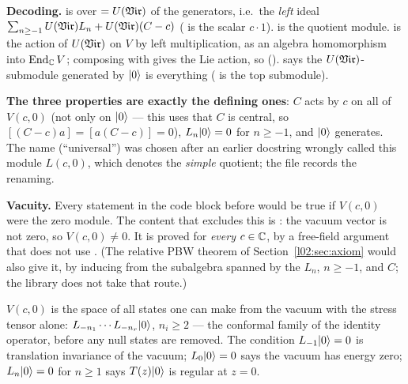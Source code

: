 \begin{dictionary}
\textbf{Decoding.}  is  over  $=U(\mathfrak{Vir})$ of
the generators, i.e.\ the \emph{left} ideal $\sum_{n\ge-1}U(\mathfrak{Vir})L_n + U(\mathfrak{Vir})(C-c)$
( is the scalar $c\cdot 1$).  is the quotient module.
 is the action of $U(\mathfrak{Vir})$ on $V$ by left multiplication, as an
algebra homomorphism into $\operatorname{End}_{\mathbb{C}} V$; composing with  gives the Lie action, so
 ().  says the
$U(\mathfrak{Vir})$-submodule generated by $|0\rangle$ is everything ( is the top submodule).

\textbf{The three properties are exactly the defining ones}: $C$ acts by $c$ on all of $V(c,0)$
(not only on $|0\rangle$ --- this uses that $C$ is central, so $[(C-c)a] = [a(C-c)] = 0$),
$L_n|0\rangle = 0$ for $n\ge -1$, and $|0\rangle$ generates. The name  (``universal'')
was chosen after an earlier docstring wrongly called this module $L(c,0)$, which denotes the
\emph{simple} quotient; the file records the renaming.

\textbf{Vacuity.} Every statement in the code block before  would be true
if $V(c,0)$ were the zero module. The content that excludes this is : the
vacuum vector is not zero, so $V(c,0)\ne0$. It is proved for \emph{every} $c\in{\mathbb{C}}$, by a free-field
argument that does not use . (The relative PBW theorem of
Section~\ref{l02:sec:axiom} would also give it, by inducing from the subalgebra spanned by the
$L_n$, $n\ge-1$, and $C$; the library does not take that route.)
\end{dictionary}

\begin{physics}
$V(c,0)$ is the space of all states one can make from the vacuum with the stress tensor alone:
$L_{-n_1}\cdots L_{-n_r}|0\rangle$, $n_i\ge2$ --- the conformal family of the identity operator,
before any null states are removed. The condition $L_{-1}|0\rangle = 0$ is translation invariance
of the vacuum; $L_0|0\rangle = 0$ says the vacuum has energy zero; $L_n|0\rangle=0$ for $n\ge1$
says $T(z)|0\rangle$ is regular at $z=0$.
\end{physics}

